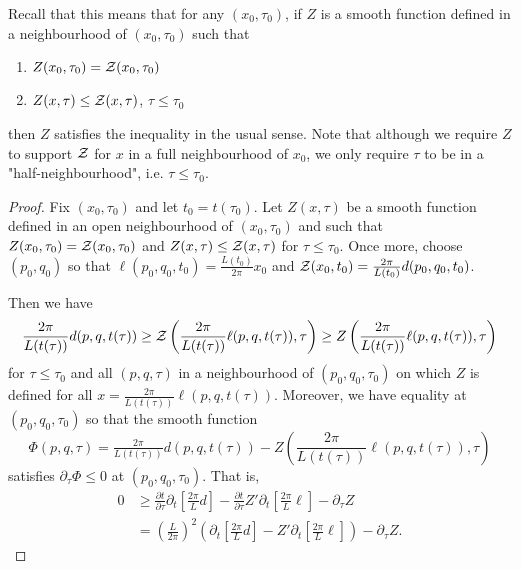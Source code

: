 \documentclass[a4paper, 12pt]{amsart}
\begin{document}
Recall that this means that for any $(x_0,\tau_0)$, if $Z$ is a smooth function defined in a neighbourhood of $(x_0,\tau_0)$ such that
\begin{enumerate}
\item $Z(x_0, \tau_0) = \operatorname{\mathcal{Z}} (x_0, \tau_0)$
\item $Z(x, \tau) \leq \operatorname{\mathcal{Z}} (x, \tau)$, $\tau \leq \tau_0$
\end{enumerate}
then $Z$ satisfies the inequality in the usual sense. Note that although we require $Z$ to support $\operatorname{\mathcal{Z}}$ for $x$ in a full neighbourhood of $x_0$, we only require $\tau$ to be in a "half-neighbourhood", i.e. $\tau\leq \tau_0$.

\begin{proof}
Fix $(x_0, \tau_0)$ and let \(t_0 = t(\tau_0)\). Let $Z(x,\tau)$ be a smooth function defined in an open neighbourhood of $(x_0,\tau_0)$ and such that $Z(x_0, \tau_0) = \operatorname{\mathcal{Z}}(x_0, \tau_0)$ and $Z(x, \tau) \leq \operatorname{\mathcal{Z}}(x, \tau)$ for $\tau\leq \tau_0$. Once more, choose $(p_0,q_0)$ so that $\ell(p_0, q_0, t_0) = \frac{L(t_0)}{2\pi} x_0$ and $\operatorname{\mathcal{Z}}(x_0, t_0) = \frac{2\pi}{L(t_0)} d(p_0, q_0, t_0)$.

Then we have
\[
\frac{2\pi}{L(t(\tau))} d(p, q, t(\tau)) \geq \operatorname{\mathcal{Z}}\left(\frac{2\pi}{L(t(\tau))}\ell(p, q, t(\tau)), \tau\right) \geq Z\left(\frac{2\pi}{L(t(\tau))}\ell(p, q, t(\tau)), \tau\right)
\]
for $\tau\leq \tau_0$ and all $(p,q,\tau)$ in a neighbourhood of $(p_0,q_0,\tau_0)$ on which $Z$ is defined for all $x=\frac{2\pi}{L(t(\tau))} \ell(p,q,t(\tau))$. Moreover, we have equality at $(p_0, q_0, \tau_0)$ so that the smooth function
\[
\Phi(p, q, \tau) = \tfrac{2\pi}{L(t(\tau))}d(p,q,t(\tau)) - Z\left(\frac{2\pi}{L(t(\tau))}\ell(p, q, t(\tau)), \tau\right)
\]
satisfies $\partial_{\tau} \Phi \leq 0$ at $(p_0, q_0, \tau_0)$. That is,
\begin{equation}
\label{eq:tau_ineq}
\begin{split}
0 &\geq \frac{\partial t}{\partial \tau} \partial_t \left[\frac{2\pi}{L} d\right] - \frac{\partial t}{\partial \tau} Z' \partial_t \left[\frac{2\pi}{L}\ell\right] - \partial_{\tau} Z \\
&= \left(\frac{L}{2\pi}\right)^2 \left(\partial_t \left[\frac{2\pi}{L} d\right] - Z' \partial_t \left[\frac{2\pi}{L}\ell\right]\right) - \partial_{\tau} Z.
\end{split}
\end{equation}


\end{proof}
\end{document}
